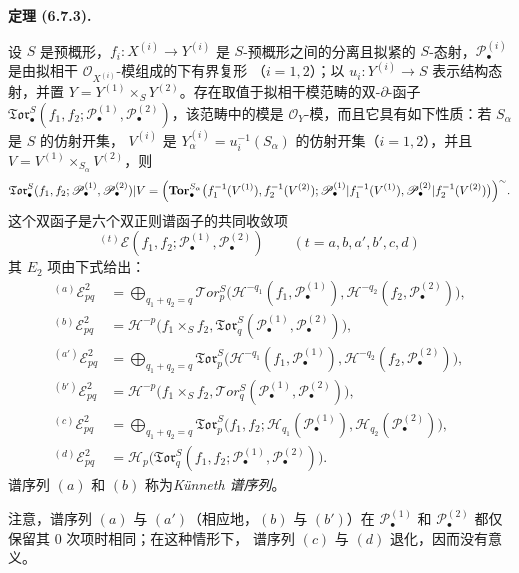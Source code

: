 \documentclass[UTF8,fontset=none,11pt,oneside,openany]{ctexbook}
\newenvironment{theorem}[1][]{%
  \par\medskip\noindent\textbf{定理 (#1).}\ %
}{\par}
\newcommand{\oldpage}[2][]{%
  \hypertarget{ega-source-page-#1-#2}{}%
  \marginnote{\scriptsize\textbf{#1}~|~#2}\ignorespaces}
\begin{document}
\begin{theorem}[6.7.3]
设 $S$ 是预概形，$f_i:X^{(i)}\to Y^{(i)}$ 是 $S$-预概形之间的分离且拟紧的
$S$-态射，$\mathscr P_\bullet^{(i)}$ 是由拟相干 $\mathscr O_{X^{(i)}}$-模组成的下有界复形
（$i=1,2$）；以 $u_i:Y^{(i)}\to S$ 表示结构态射，并置
$Y=Y^{(1)}\times_S Y^{(2)}$。存在取值于拟相干模范畴的双-$\partial$-函子
  $\mathfrak{Tor}_\bullet^S
(f_1,f_2;\mathscr P_\bullet^{(1)},\mathscr P_\bullet^{(2)})$，该范畴中的模是
$\mathscr O_Y$-模，而且它具有如下性质：若 $S_\alpha$ 是 $S$ 的仿射开集，
$V^{(i)}$ 是 $Y_\alpha^{(i)}=u_i^{-1}(S_\alpha)$ 的仿射开集（$i=1,2$），并且
$V=V^{(1)}\times_{S_\alpha}V^{(2)}$，则
\[
  \mathfrak{Tor}_\bullet^S
  (f_1,f_2;\mathscr P_\bullet^{(1)},\mathscr P_\bullet^{(2)})|V
  =\Bigl(\mathbf{Tor}_\bullet^{S_\alpha}
    \bigl(f_1^{-1}(V^{(1)}),f_2^{-1}(V^{(2)});
      \mathscr P_\bullet^{(1)}|f_1^{-1}(V^{(1)}),
      \mathscr P_\bullet^{(2)}|f_2^{-1}(V^{(2)})\bigr)\Bigr)^{\sim}.
\]
\oldpage[III]{159}
这个双函子是六个双正则谱函子的共同收敛项
\[
  {}^{(t)}\mathscr E
  (f_1,f_2;\mathscr P_\bullet^{(1)},\mathscr P_\bullet^{(2)})
  \qquad(t=a,b,a',b',c,d)
\]
其 $E_2$ 项由下式给出：
\[
\begin{aligned}
  {}^{(a)}\mathscr E_{pq}^2
  &=\bigoplus_{q_1+q_2=q}
    \mathscr{T}\!or_p^S
    \bigl(\mathscr H^{-q_1}(f_1,\mathscr P_\bullet^{(1)}),
          \mathscr H^{-q_2}(f_2,\mathscr P_\bullet^{(2)})\bigr),\\
  {}^{(b)}\mathscr E_{pq}^2
  &=\mathscr H^{-p}\bigl(f_1\times_S f_2,
    \mathfrak{Tor}_q^S
    (\mathscr P_\bullet^{(1)},\mathscr P_\bullet^{(2)})\bigr),\\
  {}^{(a')}\mathscr E_{pq}^2
  &=\bigoplus_{q_1+q_2=q}
    \mathfrak{Tor}_p^S
    \bigl(\mathscr H^{-q_1}(f_1,\mathscr P_\bullet^{(1)}),
          \mathscr H^{-q_2}(f_2,\mathscr P_\bullet^{(2)})\bigr),\\
  {}^{(b')}\mathscr E_{pq}^2
  &=\mathscr H^{-p}\bigl(f_1\times_S f_2,
    \mathscr{T}\!or_q^S
    (\mathscr P_\bullet^{(1)},\mathscr P_\bullet^{(2)})\bigr),\\
  {}^{(c)}\mathscr E_{pq}^2
  &=\bigoplus_{q_1+q_2=q}
    \mathfrak{Tor}_p^S
    \bigl(f_1,f_2;
      \mathscr H_{q_1}(\mathscr P_\bullet^{(1)}),
      \mathscr H_{q_2}(\mathscr P_\bullet^{(2)})\bigr),\\
  {}^{(d)}\mathscr E_{pq}^2
  &=\mathscr H_p\bigl(\mathfrak{Tor}_q^S
    (f_1,f_2;\mathscr P_\bullet^{(1)},\mathscr P_\bullet^{(2)})\bigr).
\end{aligned}
\]
谱序列 $(a)$ 和 $(b)$ 称为\emph{Künneth 谱序列}。

注意，谱序列 $(a)$ 与 $(a')$（相应地，$(b)$ 与 $(b')$）在
$\mathscr P_\bullet^{(1)}$ 和 $\mathscr P_\bullet^{(2)}$ 都仅保留其 0 次项时相同；在这种情形下，
谱序列 $(c)$ 与 $(d)$ 退化，因而没有意义。
\end{theorem}
\end{document}
